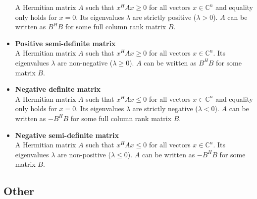 \documentclass[11pt]{article}
\theoremstyle{plain} %
\theoremstyle{definition}
\theoremstyle{remark}
\begin{document}
\begin{itemize}
A Hermitian matrix $A$ such that $x^HAx \ge 0$ for all vectors $x \in \mathbb{C}^n$ and equality only holds for $x = 0$. Its eigenvalues $\lambda$ are strictly positive ($\lambda > 0$). $A$ can be written as $B^HB$ for some full column rank matrix $B$.
\item \textbf{Positive semi-definite matrix}\\
A Hermitian matrix $A$ such that $x^HAx \ge 0$ for all vectors $x \in \mathbb{C}^n$. Its eigenvalues $\lambda$ are non-negative ($\lambda \ge 0$). $A$ can be written as $B^HB$ for some matrix $B$.
\item \textbf{Negative definite matrix}\\
A Hermitian matrix $A$ such that $x^HAx \le 0$ for all vectors $x \in \mathbb{C}^n$ and equality only holds for $x = 0$. Its eigenvalues $\lambda$ are strictly negative ($\lambda < 0$). $A$ can be written as $-B^HB$ for some full column rank matrix $B$.
\item \textbf{Negative semi-definite matrix}\\
A Hermitian matrix $A$ such that $x^HAx \le 0$ for all vectors $x \in \mathbb{C}^n$. Its eigenvalues $\lambda$ are non-positive ($\lambda \le 0$). $A$ can be written as $-B^HB$ for some matrix $B$.
\end{itemize}



\subsection{Other}
\end{document}
